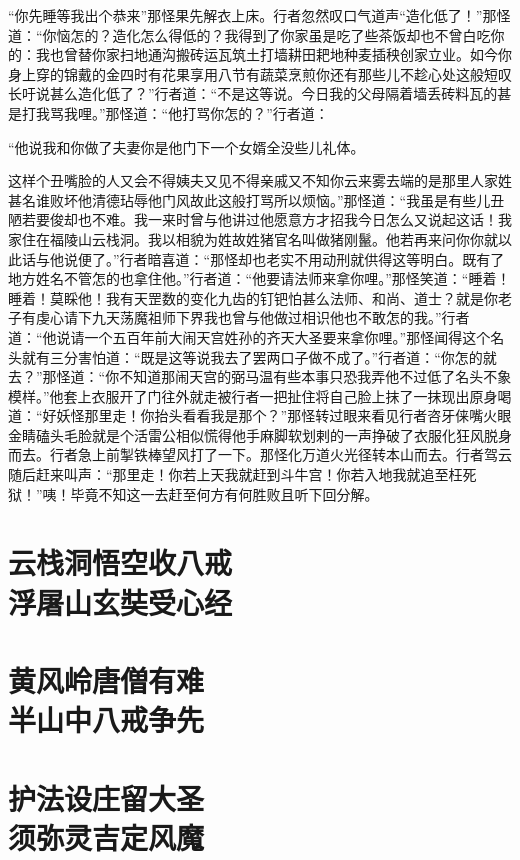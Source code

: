 \documentclass[12pt,UTF8]{ctexbook}
\begin{document}
{“你先睡等我出个恭来”那怪果先解衣上床。行者忽然叹口气道声“造化低了！”那怪道：“你恼怎的？造化怎么得低的？我得到了你家虽是吃了些茶饭却也不曾白吃你的：我也曾替你家扫地通沟搬砖运瓦筑土打墙耕田耙地种麦插秧创家立业。如今你身上穿的锦戴的金四时有花果享用八节有蔬菜烹煎你还有那些儿不趁心处这般短叹长吁说甚么造化低了？”行者道：“不是这等说。今日我的父母隔着墙丢砖料瓦的甚是打我骂我哩。”那怪道：“他打骂你怎的？”行者道：

“他说我和你做了夫妻你是他门下一个女婿全没些儿礼体。

这样个丑嘴脸的人又会不得姨夫又见不得亲戚又不知你云来雾去端的是那里人家姓甚名谁败坏他清德玷辱他门风故此这般打骂所以烦恼。”那怪道：“我虽是有些儿丑陋若要俊却也不难。我一来时曾与他讲过他愿意方才招我今日怎么又说起这话！我家住在福陵山云栈洞。我以相貌为姓故姓猪官名叫做猪刚鬣。他若再来问你你就以此话与他说便了。”行者暗喜道：“那怪却也老实不用动刑就供得这等明白。既有了地方姓名不管怎的也拿住他。”行者道：“他要请法师来拿你哩。”那怪笑道：“睡着！睡着！莫睬他！我有天罡数的变化九齿的钉钯怕甚么法师、和尚、道士？就是你老子有虔心请下九天荡魔祖师下界我也曾与他做过相识他也不敢怎的我。”行者道：“他说请一个五百年前大闹天宫姓孙的齐天大圣要来拿你哩。”那怪闻得这个名头就有三分害怕道：“既是这等说我去了罢两口子做不成了。”行者道：“你怎的就去？”那怪道：“你不知道那闹天宫的弼马温有些本事只恐我弄他不过低了名头不象模样。”他套上衣服开了门往外就走被行者一把扯住将自己脸上抹了一抹现出原身喝道：“好妖怪那里走！你抬头看看我是那个？”那怪转过眼来看见行者咨牙俫嘴火眼金睛磕头毛脸就是个活雷公相似慌得他手麻脚软划剌的一声挣破了衣服化狂风脱身而去。行者急上前掣铁棒望风打了一下。那怪化万道火光径转本山而去。行者驾云随后赶来叫声：“那里走！你若上天我就赶到斗牛宫！你若入地我就追至枉死狱！”咦！毕竟不知这一去赶至何方有何胜败且听下回分解。

\chapter[云栈洞悟空收八戒\ 浮屠山玄奘受心经]{云栈洞悟空收八戒\\浮屠山玄奘受心经}
\chapter[黄风岭唐僧有难\ 半山中八戒争先]{黄风岭唐僧有难\\半山中八戒争先}
\chapter[护法设庄留大圣\ 须弥灵吉定风魔]{护法设庄留大圣\\须弥灵吉定风魔}

}
\end{document}
